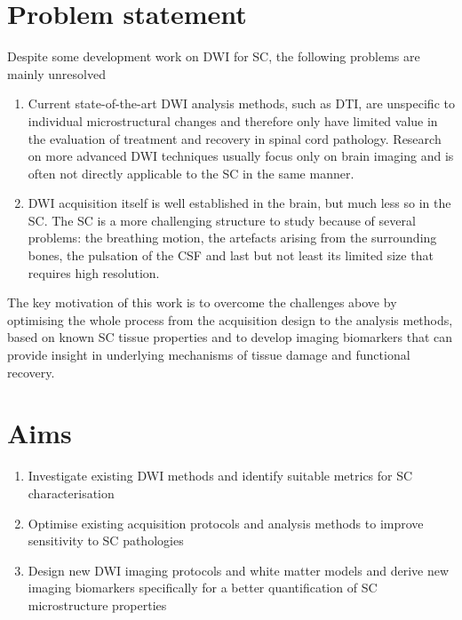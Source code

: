 

\section{Problem statement}
Despite some development work on \gls{DWI} for \gls{SC}, the following problems are mainly unresolved 
\begin{enumerate}
\item Current state-of-the-art \gls{DWI} analysis methods, such as \gls{DTI}, are unspecific to individual microstructural changes and therefore only have limited value in the evaluation of treatment and recovery in spinal cord pathology. Research on more advanced \gls{DWI} techniques usually focus only on brain imaging and is often not directly applicable to the \gls{SC} in the same manner.
\item \gls{DWI} acquisition itself is well established in the brain, but much less so in the \gls{SC}. The \gls{SC} is a more challenging structure to study because of several problems: the breathing motion, the artefacts arising from the surrounding bones, the pulsation of the {\gls{CSF}} and last but not least its limited size that requires high resolution.  
\end{enumerate} 
The key motivation of this work is to overcome the challenges above by optimising the whole process from the acquisition design to the analysis methods, based on known \gls{SC} tissue properties and to develop imaging biomarkers that can provide insight in underlying mechanisms of tissue damage and functional recovery.

\section{Aims}
\begin{enumerate}
  \item Investigate existing \gls{DWI} methods and identify suitable metrics for \gls{SC} characterisation
  \item Optimise existing acquisition protocols and analysis methods to improve sensitivity to \gls{SC} pathologies
  \item Design new \gls{DWI} imaging protocols and white matter models and derive new imaging biomarkers specifically for a better quantification of \gls{SC} microstructure properties
\end{enumerate}

